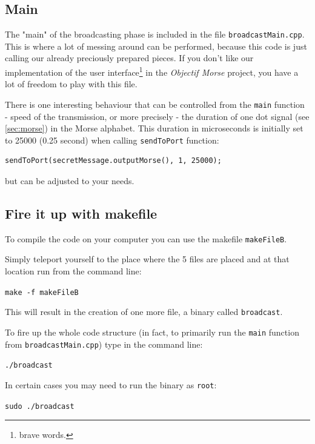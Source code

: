 \documentclass[12pt]{report}
\begin{document}
\subsection{Main}

The "main" of the broadcasting phase is included in the file \verb|broadcastMain.cpp|. This is where a lot of messing around can be performed, because this code is just calling our already preciously prepared pieces. If you don't like our implementation of the user interface\footnote{brave words.} in the \textit{Objectif Morse} project, you have a lot of freedom to play with this file.

There is one interesting behaviour that can be controlled from the \verb|main| function - speed of the transmission, or more precisely - the duration of one dot signal (see \ref{sec:morse}) in the Morse alphabet. This duration in microseconds is initially set to 25000 (0.25 second) when calling \verb|sendToPort| function: 

\begin{lstlisting}
sendToPort(secretMessage.outputMorse(), 1, 25000);
\end{lstlisting}

but can be adjusted to your needs.

\subsection{Fire it up with makefile}

To compile the code on your computer you can use the makefile \verb|makeFileB|.

Simply teleport yourself to the place where the 5 files are placed and at that location run from the command line:

\begin{snugshade}
\verb|make -f makeFileB|
\end{snugshade}

This will result in the creation of one more file, a binary called \verb|broadcast|.

To fire up the whole code structure (in fact, to primarily run the \verb|main| function from \verb|broadcastMain.cpp|) type in the command line:

\begin{snugshade}
\verb|./broadcast|
\end{snugshade}


In certain cases you may need to run the binary as \verb|root|:

\begin{snugshade}
\verb|sudo ./broadcast|
\end{snugshade}
\end{document}
